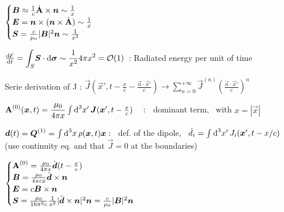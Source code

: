 \item $        \begin{cases}
\vec{B} \approx \frac{1}{c}\dot{\vec{\rm{A}}} \times \vec{n} \sim \frac{1}{x} \\
\vec{E} = \vec{n} \times (\vec{n} \times \dot{\vec{\rm{A}}}) \sim \frac{1}{x} \\
\vec{S} = \frac{c}{\mu_0} |\vec{B}|^2\vec{n} \sim \frac{1}{x^2}\\
\end{cases}$

\item $ \frac{\ud \E}{\ud t} = \displaystyle{\int_{S}} \vec{S}\cdot \vec{\ud \sigma} \sim \frac{1}{x^2}4\pi x^2 = \mathcal{O}(1)\, $ : Radiated energy per unit of time\\

\squishend 


\squishlist
\item Serie derivation of J : $ \vec{J}(\vec{x}', t - \frac{x}{c} - \frac{\vec{n}\cdot\vec{x}'}{c}) \rightarrow \sum_{n=0}^{+\infty} \vec{J}^{(n)} \left(\frac{\vec{n}\cdot\vec{x}'}{c}\right)^n$

\item $\vec{\rm{A}}^{(0)}(\vec{x},t) = \dfrac{\mu_0}{4\pi x} \int \ud ^3x' \, \vec{J}(\vec{x}', t-\frac{x}{c}) \quad :$ \,  dominant term, \, with $x = |\vec{x}|$

\item $\vec{d}(t) = \vec{Q}^{(1)} = \int \ud ^3x \, \rho(\vec{x},t)\vec{x}  :$ \, def. of the dipole, \, $\dot{d}_i = \int \ud ^3x' \, J_i(\vec{x}',t-x/c)$ \, (use continuity eq. and that $\vec{J}=0$ at the boundaries)

\item$        \begin{cases}
\vec{\rm{A}}^{(0)} = \frac{\mu_0}{4\pi x}\dot{\vec{d}}(t-\frac{x}{c}) \\
\vec{B} =\frac{\mu_0}{4\pi c x} \ddot{\vec{d}} \times \vec{n} \\
\vec{E} = c\vec{B} \times \vec{n}\\
\vec{S} = \frac{\mu_0}{16\pi^2c}\frac{1}{x^2} |\ddot{\vec{d}} \times \vec{n}|^2\vec{n} = \frac{c}{\mu_0} |\vec{B}|^2\vec{n}
\end{cases} $

